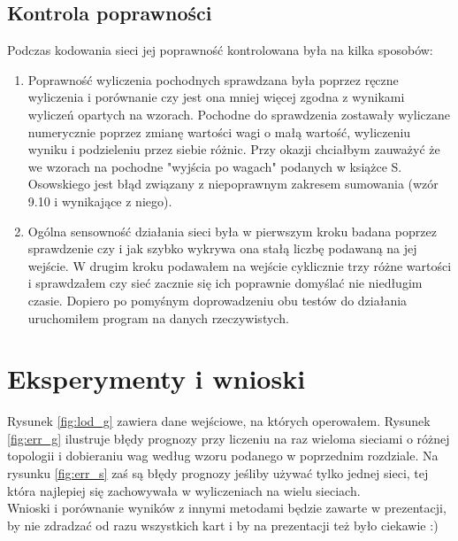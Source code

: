 \documentclass[12pt,a4]{article}
\begin{document}
\subsection{Kontrola poprawności}
Podczas kodowania sieci jej poprawność kontrolowana była na kilka sposobów:
\begin{enumerate}
\item Poprawność wyliczenia pochodnych sprawdzana była poprzez ręczne wyliczenia i porównanie czy jest ona mniej więcej
zgodna z wynikami wyliczeń opartych na wzorach. Pochodne do sprawdzenia zostawały wyliczane numerycznie poprzez zmianę 
wartości wagi o małą wartość, wyliczeniu wyniku i podzieleniu przez siebie różnic.
Przy okazji chciałbym zauważyć że we wzorach na pochodne "wyjścia po wagach" podanych w książce S. 
Osowskiego jest błąd związany z niepoprawnym zakresem sumowania (wzór 9.10 i wynikające z niego).
\item Ogólna sensowność działania sieci była w pierwszym kroku badana poprzez sprawdzenie czy i jak szybko wykrywa ona
stałą liczbę podawaną na jej wejście. W drugim kroku podawałem na wejście cyklicznie trzy różne wartości i sprawdzałem
czy sieć zacznie się ich poprawnie domyślać nie niedługim czasie. Dopiero po pomyśnym doprowadzeniu obu testów do działania
uruchomiłem program na danych rzeczywistych.
\end{enumerate}

\section{Eksperymenty i wnioski}

Rysunek \ref{fig:lod_g} zawiera dane wejściowe, na których operowałem. Rysunek \ref{fig:err_g} ilustruje błędy prognozy
przy liczeniu na raz wieloma sieciami o różnej topologii i dobieraniu wag według wzoru podanego w poprzednim rozdziale.
Na rysunku \ref{fig:err_s} zaś są błędy prognozy jeśliby używać tylko jednej sieci, tej która najlepiej się zachowywała
w wyliczeniach na wielu sieciach.\\
\indent Wnioski i porównanie wyników z innymi metodami będzie zawarte w prezentacji, 
by nie zdradzać od razu wszystkich kart i by na prezentacji też było ciekawie :)
\end{document}
